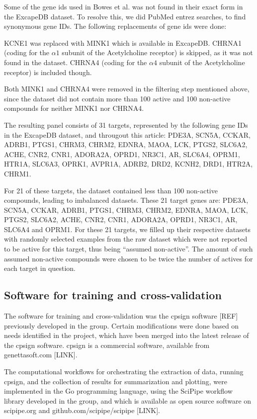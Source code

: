 \documentclass[utf8]{frontiersSCNS} %
\newcommand{\todoil}[1]{\todo[inline]{#1}}
\begin{document}
Some of the gene ids used in Bowes et al. was not found in their exact form in
the ExcapeDB dataset. To resolve this, we did PubMed entrez searches, to find
synonymous gene IDs. The following replacements of gene ids were done:

KCNE1 was replaced with MINK1 which is available in ExcapeDB. CHRNA1 (coding
for the $\alpha1$ subunit of the Acetylcholine receptor) is skipped, as it was
not found in the dataset. CHRNA4 (coding for the $\alpha4$ subunit of the
Acetylcholine receptor) is included though.

Both MINK1 and CHRNA4 were removed in the filtering step mentioned above, since
the dataset did not contain more than 100 active and 100 non-active compounds
for neither MINK1 nor CHRNA4.

The resulting panel consists of 31 targets, represented by the following gene
IDs in the ExcapeDB dataset, and througout this article: PDE3A,
SCN5A, CCKAR, ADRB1, PTGS1, CHRM3, CHRM2, EDNRA, MAOA, LCK,
PTGS2, SLC6A2, ACHE, CNR2, CNR1, ADORA2A, OPRD1, NR3C1, AR,
SLC6A4, OPRM1, HTR1A, SLC6A3, OPRK1, AVPR1A, ADRB2, DRD2,
KCNH2, DRD1, HTR2A, CHRM1.

For 21 of these targets, the dataset contained less than 100 non-active
compounds, leading to imbalanced datasets. These 21 target genes are: PDE3A,
SCN5A, CCKAR, ADRB1, PTGS1, CHRM3, CHRM2, EDNRA, MAOA, LCK, PTGS2, SLC6A2,
ACHE, CNR2, CNR1, ADORA2A, OPRD1, NR3C1, AR, SLC6A4 and OPRM1. For these 21
targets, we filled up their respective datasets with randomly selected
examples from the raw dataset which were not reported to be active for this
target, thus being ``assumed non-active''. The amount of such assumed
non-active compounds were chosen to be twice the number of actives for each
target in question.

\subsection{Software for training and cross-validation}

The software for training and cross-validation was the cpsign software [REF]
previously developed in the group. Certain modifications were done based on
needs identified in the project, which have been merged into the latest
release of the cpsign software. cpsign is a commercial software, available
from genettasoft.com [LINK]. \todoil{Add something about academic licenses?}

The computational workflows for orchestrating the extraction of data, running
cpsign, and the collection of results for summarization and plotting, were
implemented in the Go programming language, using the SciPipe workflow library
developed in the group, and which is available as open source software on
scipipe.org and github.com/scipipe/scipipe [LINK].
\end{document}
